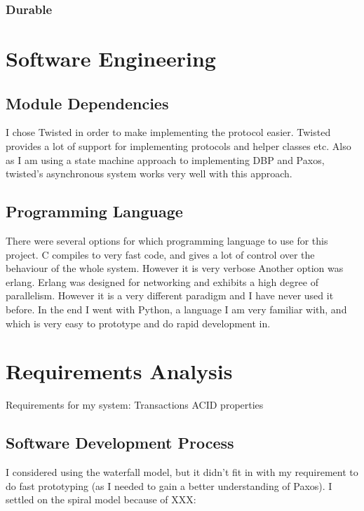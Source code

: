 \documentclass[12pt,twoside,notitlepage]{report}
\begin{document}
\subsubsection*{Durable}



\section{Software Engineering}

\subsection{Module Dependencies}

I chose Twisted in order to make implementing the protocol easier. Twisted provides a lot of
support for implementing protocols and helper classes etc. Also as I am using a state machine
approach to implementing DBP and Paxos, twisted's asynchronous system works very well with this
approach.

\subsection{Programming Language}

There were several options for which programming language to use for this project.  C compiles to
very fast code, and gives a lot of control over the behaviour of the whole system.  However it is
very verbose Another option was erlang. Erlang was designed for networking and exhibits a high
degree of parallelism. However it is a very different paradigm and I have never used it before.
In the end I went with Python, a language I am very familiar with, and which is very easy to
prototype and do rapid development in.

\section{Requirements Analysis}

Requirements for my system:
Transactions
ACID properties

\subsection{Software Development Process}

I considered using the waterfall model, but it didn't fit in with my requirement to do fast
prototyping (as I needed to gain a better understanding of Paxos). I settled on the spiral model
because of XXX:
\end{document}
